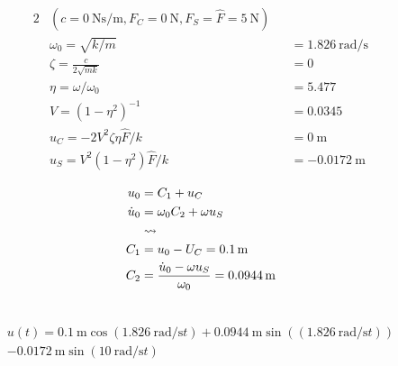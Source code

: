    \begin{solution}
        \begin{alignat*}{2}
            &(c = \SI{0}{\newton\second\per\meter}, F_C = \SI{0}{\newton}, F_S = \hat{F} = \SI{5}{\newton})\\
            &\omega_0 = \sqrt{k/m} &&= \SI{1.826}{\radian\per\second} \\
            &\zeta = \frac{c}{2\sqrt{mk}} &&= 0 \\
            &\eta = \omega/\omega_0 &&= 5.477\\
            &V = (1-\eta^2)^{-1} &&=  0.0345 \\
            &u_C = -2V^2\zeta\eta\hat{F}/k &&= \SI{0}{\meter} \\
            &u_S = V^2(1-\eta^2)\hat{F}/k &&= \SI{-0.0172}{\meter}
        \end{alignat*}

        \begin{align*}
            u_0 &= C_1 + u_C \\
            \dot{u}_0 &= \omega_0 C_2+\omega u_S\\
            &\rightsquigarrow \\
            C_1 &=  u_0 - U_C = \SI{0.1}{\meter}\\
            C_2 &= \frac{\dot{u}_0 - \omega u_S}{\omega_0} = \SI{0.0944}{\meter} \\
            \vspace{1cm}
        \end{align*}

        \begin{equation*}
            \begin{split}
                u(t) = \SI{0.1}{\meter} \cos{(\SI{1.826}{\radian\per\second} t)} +\SI{0.0944}{\meter} \sin{((\SI{1.826}{\radian\per\second} t))} \\ - \SI{0.0172}{\meter}\sin{(\SI{10}{\radian\per\second} t)}
            \end{split}
        \end{equation*}
    \end{solution}
    


    

